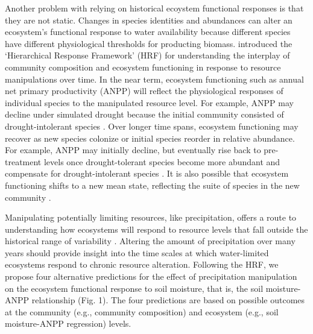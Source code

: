 \documentclass[fleqn,10pt,lineno]{wlpeerj} %
\begin{document}
Another problem with relying on historical ecoystem functional responses
is that they are not static. Changes in species identities and
abundances can alter an ecosystem's functional response to water
availability because different species have different physiological
thresholds for producting biomass. \citet{Smith2009} introduced the
`Hierarchical Response Framework' (HRF) for understanding the interplay
of community composition and ecosystem functioning in response to
resource manipulations over time. In the near term, ecosystem
functioning such as annual net primary productivity (ANPP) will reflect
the physiological responses of individual species to the manipulated
resource level. For example, ANPP may decline under simulated drought
because the initial community consisted of drought-intolerant species
\citep{Hoover2014}. Over longer time spans, ecosystem functioning may
recover as new species colonize or initial species reorder in relative
abundance. For example, ANPP may initially decline, but eventually rise
back to pre-treatment levels once drought-tolerant species become more
abundant and compensate for drought-intolerant species
\citep{Hoover2014}. It is also possible that ecosystem functioning
shifts to a new mean state, reflecting the suite of species in the new
community \citep{Knapp2012}.

Manipulating potentially limiting resources, like precipitation, offers
a route to understanding how ecosystems will respond to resource levels
that fall outside the historical range of variability
\citep{Avolio2015, Gherardi2015, Knapp2017}. Altering the amount of
precipitation over many years should provide insight into the time
scales at which water-limited ecosystems respond to chronic resource
alteration. Following the HRF, we propose four alternative predictions
for the effect of precipitation manipulation on the ecosystem functional
response to soil moisture, that is, the soil moisture-ANPP relationship
(Fig. 1). The four predictions are based on possible outcomes at the
community (e.g., community composition) and ecosystem (e.g., soil
moisture-ANPP regression) levels.
\end{document}
